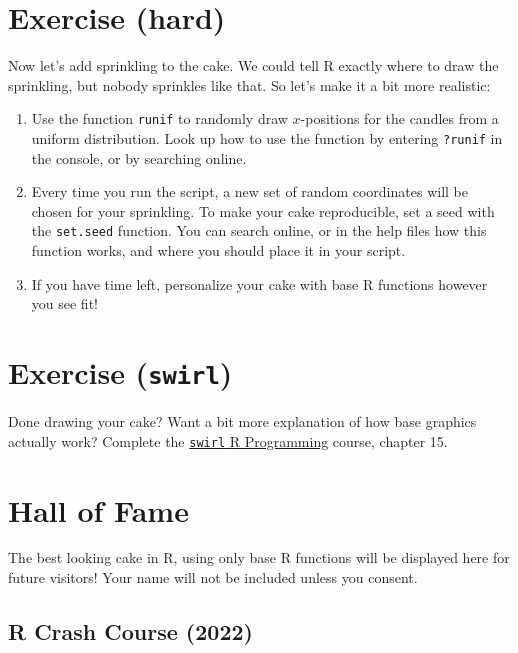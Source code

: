 \documentclass[
]{book}
\providecommand{\tightlist}{%
  \setlength{\itemsep}{0pt}\setlength{\parskip}{0pt}}
\begin{document}
\hypertarget{exercise-hard}{%
\section{Exercise (hard)}\label{exercise-hard}}

Now let's add sprinkling to the cake. We could tell R exactly where to draw the sprinkling, but nobody sprinkles like that. So let's make it a bit more realistic:

\begin{enumerate}
\def\labelenumi{\arabic{enumi}.}
\tightlist
\item
  Use the function \texttt{runif} to randomly draw \(x\)-positions for the candles from a uniform distribution. Look up how to use the function by entering \texttt{?runif} in the console, or by searching online.
\item
  Every time you run the script, a new set of random coordinates will be chosen for your sprinkling. To make your cake reproducible, set a seed with the \texttt{set.seed} function. You can search online, or in the help files how this function works, and where you should place it in your script.
\item
  If you have time left, personalize your cake with base R functions however you see fit!
\end{enumerate}

\hypertarget{exercise-swirl}{%
\section{\texorpdfstring{Exercise (\texttt{swirl})}{Exercise (swirl)}}\label{exercise-swirl}}

Done drawing your cake? Want a bit more explanation of how base graphics actually work? Complete the \href{https://youtu.be/eKKil5iyxLM?t=148}{\texttt{swirl} R Programming} course, chapter 15.

\hypertarget{hall-of-fame}{%
\section*{Hall of Fame}\label{hall-of-fame}}

The best looking cake in R, using only base R functions will be displayed here for future visitors! Your name will not be included unless you consent.

\hypertarget{r-crash-course-2022}{%
\subsection*{R Crash Course (2022)}\label{r-crash-course-2022}}
\end{document}
